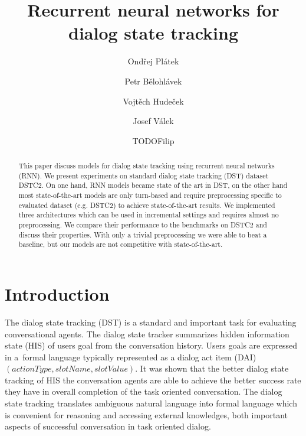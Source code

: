 \documentclass{itatnew}
\begin{document}
\title{Recurrent neural networks for dialog state tracking}

\author{Ondřej Plátek \and Petr Bělohlávek \and Vojtěch Hudeček \and
Josef Válek \and TODOFilip}


\maketitle              %

\begin{abstract}
This paper discuss models for dialog state tracking using recurrent neural networks (RNN).
We present experiments on standard dialog state tracking (DST) dataset DSTC2\cite{henderson2014second}.
On one hand, RNN models became state of the art in DST,
on the other hand most state-of-the-art models are only turn-based and require preprocessing specific to evaluated dataset (e.g. DSTC2) to achieve state-of-the-art results.
We implemented three architectures which can be used in incremental settings and requires almost no preprocessing.
We compare their performance to the benchmarks on DSTC2 and discuss their properties.
With only a trivial preprocessing we were able to beat a baseline, but our models are not competitive with state-of-the-art.
\end{abstract}
%
\section{Introduction}
%
The dialog state tracking (DST) is a standard and important task for evaluating conversational agents\cite{williams2013dialog, henderson2014second, henderson2014third}.
The dialog state tracker summarizes hidden information state (HIS)\cite{young2010hidden} of users goal from the conversation history.
Users goals are expressed in a~formal language typically represented as a dialog act item (DAI) $(actionType, slotName, slotValue)$.
It was shown that the better dialog state tracking of HIS the conversation agents are able to achieve the better success rate they have in overall completion of the task oriented conversation\cite{jurvcivcek2012reinforcement}.
The dialog state tracking translates ambiguous natural language into formal language which is convenient for reasoning and accessing external knowledges, both important aspects of successful conversation in task oriented dialog.
\end{document}
